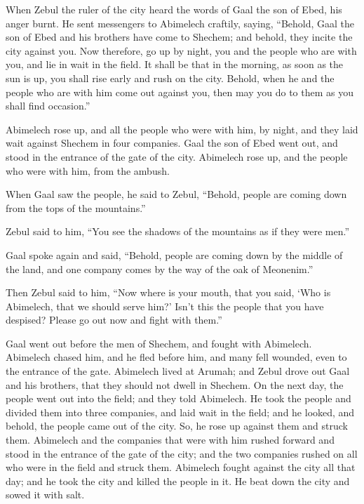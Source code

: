  When Zebul the ruler of the city heard the words of Gaal
the son of Ebed, his anger burnt.  He sent messengers to
Abimelech craftily, saying, ``Behold, Gaal the son of Ebed and his
brothers have come to Shechem; and behold, they incite the city against
you.  Now therefore, go up by night, you and the people who
are with you, and lie in wait in the field.  It shall be
that in the morning, as soon as the sun is up, you shall rise early and
rush on the city. Behold, when he and the people who are with him come
out against you, then may you do to them as you shall find occasion.''

 Abimelech rose up, and all the people who were with him,
by night, and they laid wait against Shechem in four companies.
 Gaal the son of Ebed went out, and stood in the entrance
of the gate of the city. Abimelech rose up, and the people who were with
him, from the ambush.

 When Gaal saw the people, he said to Zebul, ``Behold,
people are coming down from the tops of the mountains.''

Zebul said to him, ``You see the shadows of the mountains as if they
were men.''

 Gaal spoke again and said, ``Behold, people are coming
down by the middle of the land, and one company comes by the way of the
oak of Meonenim.''

 Then Zebul said to him, ``Now where is your mouth, that
you said, `Who is Abimelech, that we should serve him?' Isn't this the
people that you have despised? Please go out now and fight with them.''

 Gaal went out before the men of Shechem, and fought with
Abimelech.  Abimelech chased him, and he fled before him,
and many fell wounded, even to the entrance of the gate. 
Abimelech lived at Arumah; and Zebul drove out Gaal and his brothers,
that they should not dwell in Shechem.  On the next day,
the people went out into the field; and they told Abimelech.
 He took the people and divided them into three companies,
and laid wait in the field; and he looked, and behold, the people came
out of the city. So, he rose up against them and struck them.
 Abimelech and the companies that were with him rushed
forward and stood in the entrance of the gate of the city; and the two
companies rushed on all who were in the field and struck them.
 Abimelech fought against the city all that day; and he
took the city and killed the people in it. He beat down the city and
sowed it with salt.

